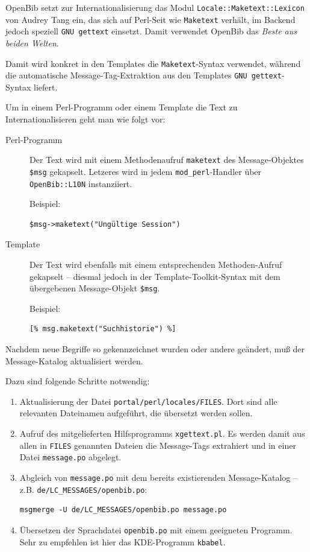 \documentclass[11pt, twoside, a4paper, BCOR8mm, DIV12, bibtotoc,idxtotoc]{scrbook}
\begin{document}
OpenBib setzt zur Internationalisierung das Modul
\texttt{Locale::Maketext::Lexicon} von Audrey Tang ein, das sich auf
Perl-Seit wie \texttt{Maketext} verhält, im Backend jedoch speziell
\texttt{GNU gettext} einsetzt. Damit verwendet OpenBib das \emph{Beste
aus beiden Welten}.

Damit wird konkret in den Templates die \texttt{Maketext}-Syntax
verwendet, während die automatische Message-Tag-Extraktion aus den
Templates \texttt{GNU gettext}-Syntax liefert.

Um in einem Perl-Programm oder einem Template die
Text zu Internationalisieren geht man wie folgt vor:

\begin{description}
\item[Perl-Programm] Der Text wird mit einem Methodenaufruf
  \texttt{maketext} des Message-Objektes \texttt{\$msg}
  gekapselt. Letzeres wird in jedem \texttt{mod\_perl}-Handler über
  \texttt{OpenBib::L10N} instanziiert.

  Beispiel:

\begin{verbatim}
$msg->maketext("Ungültige Session")
\end{verbatim}

\item[Template] Der Text wird ebenfalls mit einem entsprechenden
  Methoden-Aufruf gekapselt -- diesmal jedoch in der
  Template-Toolkit-Syntax mit dem übergebenen Message-Objekt \texttt{\$msg}.

  Beispiel:

\begin{verbatim}
[% msg.maketext("Suchhistorie") %]
\end{verbatim}
\end{description}

Nachdem neue Begriffe so gekennzeichnet wurden oder andere geändert,
muß der Message-Katalog aktualisiert werden.

Dazu sind folgende Schritte notwendig:

\begin{enumerate}
\item Aktualisierung der Datei \texttt{portal/perl/locales/FILES}. Dort
  sind alle relevanten Datei\-namen aufgeführt, die
  übersetzt werden sollen.
\item Aufruf des mitgelieferten Hilfsprogramms
  \texttt{xgettext.pl}. Es werden damit aus allen in  \texttt{FILES}
  genannten Dateien die Message-Tags extrahiert und in einer Datei
  \texttt{message.po} abgelegt.
\item Abgleich von \texttt{message.po} mit dem bereits existierenden
  Message-Katalog -- \newline z.B. \texttt{de/LC\_MESSAGES/openbib.po}:

\begin{verbatim}
msgmerge -U de/LC_MESSAGES/openbib.po message.po
\end{verbatim}
\item Übersetzen der Sprachdatei \texttt{openbib.po} mit einem
  geeigneten Programm. Sehr zu empfehlen ist hier das KDE-Programm
  \texttt{kbabel}.
\end{enumerate}
\end{document}

